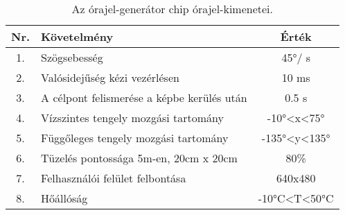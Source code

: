 \begin{table}[ht]
	\footnotesize
	\centering
	\begin{tabular}{ c l c }
		\toprule
		\textbf{Nr.} & \textbf{Követelmény}                  & \textbf{Érték} \\
		\midrule
		1.           & Szögsebesség                          & 45°/ s \\
		2.           & Valósidejűség kézi vezérlésen         & 10 ms \\
		3.           & A célpont felismerése a képbe kerülés után    & 0.5 s \\
		4.           & Vízszintes tengely mozgási tartomány  & -10°\textless{}x\textless{}75°  \\
		5.           & Függőleges tengely mozgási tartomány  & -135°\textless{}y\textless{}135° \\
		6.           & Tüzelés pontossága 5m-en, 20cm x 20cm & 80\%                             \\
		7.           & Felhasználói felület felbontása       & 640x480                          \\
		8.           & Hőállóság                             & -10°C\textless{}T\textless{}50°C \\
		\bottomrule
	\end{tabular}
	\caption{Az órajel-generátor chip órajel-kimenetei.}
	\label{tab:TabularExample}
\end{table}